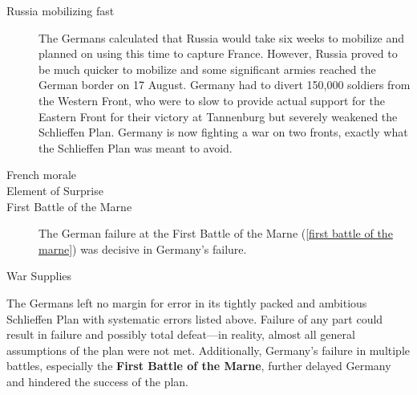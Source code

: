\documentclass[a4paper,numbers=endperiod,most,twoside,english,final,openany]{scrbook} %
\providecommand\vref[1]{\ref{#1}}
\begin{document}
\begin{description}
	\item [{Russia mobilizing fast}] The Germans calculated that Russia would take six weeks to mobilize and planned on using this time to capture France. However, Russia proved to be much quicker to mobilize and some significant armies reached the German border on 17 August. Germany had to divert 150,000 soldiers from the Western Front, who were to slow to provide actual support for the Eastern Front for their victory at Tannenburg but severely weakened the Schlieffen Plan.  Germany is now fighting a war on two fronts, exactly what the Schlieffen Plan was meant to avoid.
	\item [{French morale}] 
	\item [Element of Surprise] 
	\item [First Battle of the Marne] The German failure at the First Battle of the Marne (\vref{first battle of the marne}) was decisive in Germany's failure. 
	\item [War Supplies] 
\end{description}
The Germans left no margin for error in its tightly packed and ambitious Schlieffen Plan with systematic errors listed above. Failure of any part could result in failure and possibly total defeat---in reality, almost all general assumptions of the plan were not met. Additionally, Germany's failure in multiple battles, especially the \textbf{First Battle of the Marne}, further delayed Germany and hindered the success of the plan.
\end{document}
